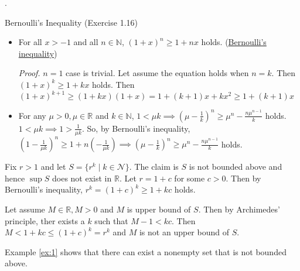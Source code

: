 \documentclass[8pt]{beamer}
\newcommand{\mbb}[1]{\mathbb{#1}}
\newcommand{\mc}[1]{\mathcal{#1}}
\newcommand{\ti}[1]{\textit{#1}}
\begin{document}
\begin{frame}{.}
    \begin{block}{Bernoulli's Inequality (Exercise 1.16)}
        \begin{itemize}
            \item  For all $x > -1$ and all $n \in \mbb{N}$, $(1+x)^n \geq 1 + nx$ holds. (\underline{Bernoulli's inequality})

            \ti{Proof.} $n=1$ case is trivial.
            Let assume the equation holds when $n=k$.
            Then $(1+x)^k \geq 1+ kx$ holds.
            Then $(1+x)^{k+1} \geq (1+kx)(1+x) = 1 + (k+1)x + kx^2 \geq 1 + (k+1)x$

            \item For any $\mu > 0, \mu \in \mbb{R}$ and $k \in \mbb{N}$, $1 < \mu k \implies (\mu - \frac{1}{k})^n \geq \mu^n - \frac{n \mu^{n-1}}{k}$ holds.
            $1 < \mu k \implies 1 > \frac{1}{\mu k}$. So, by Bernoulli's inequality, $(1 - \frac{1}{\mu k})^n \geq  1 + n(-\frac{1}{\mu k}) \implies (\mu - \frac{1}{k})^n \geq \mu^n - \frac{n \mu^{n-1}}{k}$ holds.
        \end{itemize}
    \end{block}

    \begin{example} \label{ex:1}
        Fix $r >1$ and let $S = \{r^k \mid k \in \mc{N}\}$.
        The claim is $S$ is not bounded above and hence $\sup S$ does not exist in $\mbb{R}$.
        Let $r = 1+c$ for some $c >0$.
        Then by Bernoulli's inequality, $r^k = (1+c)^k \geq 1+kc$ holds.

        Let assume $M \in \mbb{R}, M >0$ and $M$ is upper bound of $S$.
        Then by Archimedes' principle, ther exists a $k$ such that $M - 1 < kc$.
        Then $M < 1+kc \leq (1+c)^k = r^k$ and $M$ is not an upper bound of $S$.
    \end{example}

    Example \ref{ex:1} shows that there can exist a nonempty set that is not bounded above.
\end{frame}
\end{document}

